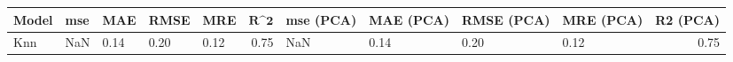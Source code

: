 \begin{table}
\centering
\label{table:iri_reg_pred}
\begin{tabular}{lllllrllllr}
\toprule
\textbf{Model} & \textbf{mse} & \textbf{MAE} & \textbf{RMSE} & \textbf{MRE} & $\textbf{R^2}$ & \textbf{mse (PCA)} & \textbf{MAE (PCA)} & \textbf{RMSE (PCA)} & \textbf{MRE (PCA)} & \textbf{R2 (PCA)} \\
\midrule
           Knn &          NaN &         0.14 &          0.20 &         0.12 &           0.75 &                NaN &               0.14 &                0.20 &               0.12 &              0.75 \\
\bottomrule
\end{tabular}
\end{table}
